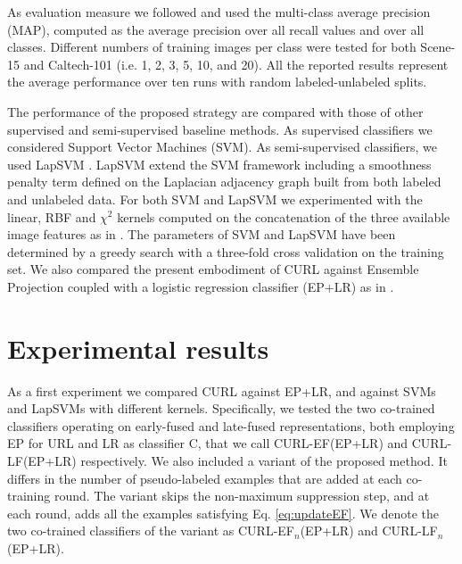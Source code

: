 \documentclass[journal,11pt]{IEEEtran}
\newcommand{\ADD}[1]{#1}
\newcommand{\coso}{strategy}
\newcommand{\emb}{embodiment}
\newcommand{\curlef}{CURL-EF(EP+LR)}
\newcommand{\curllf}{CURL-LF(EP+LR)}
\newcommand{\curlefn}{CURL-EF$_n$(EP+LR)}
\newcommand{\curllfn}{CURL-LF$_n$(EP+LR)}
\begin{document}
As evaluation measure we followed \cite{dai2013ensemble} and used the multi-class average precision (MAP),
computed as the average precision over all recall values and over all
classes.  Different numbers of training images per class were tested
for both Scene-15 and Caltech-101 (i.e. 1, 2, 3, 5, 10, and 20).  All the
reported results represent the average performance over ten runs with
random labeled-unlabeled splits.

The performance of the proposed \coso{ } are compared with those of
other supervised and semi-supervised \ADD{baseline} methods. As supervised
classifiers we considered Support Vector Machines (SVM).  As
semi-supervised classifiers, we used LapSVM
\cite{sindhwani2005beyond,belkin2006manifold}. LapSVM extend the SVM
framework including a smoothness penalty term defined on the
Laplacian adjacency graph built from both labeled and unlabeled data.
For both SVM and LapSVM we experimented with the linear, RBF and
$\chi^2$ kernels computed on the concatenation of the three available
image features as in \cite{dai2013ensemble}.  The parameters of SVM and LapSVM have been determined by
a greedy search with a three-fold cross validation on the training
set. We also compared \ADD{the present \emb{ } of CURL against} Ensemble Projection coupled with a logistic regression classifier (EP+LR) as in \cite{dai2013ensemble}. %

\section{Experimental results}\label{sec:results}
As a first experiment we compared CURL against EP+LR, and against
SVMs and LapSVMs with different kernels. Specifically, we tested the two co-trained classifiers operating on early-fused and late-fused representations, both employing EP for URL and LR as classifier C, that we call \curlef{ } and \curllf{ } respectively.
We also included a variant of the proposed method. It differs in the number of pseudo-labeled examples that are added at each co-training round. The variant skips the non-maximum suppression step, and at each round, adds all the examples satisfying Eq. \ref{eq:updateEF}. We denote the two co-trained classifiers of the variant as \curlefn{ } and \curllfn.
\end{document}
